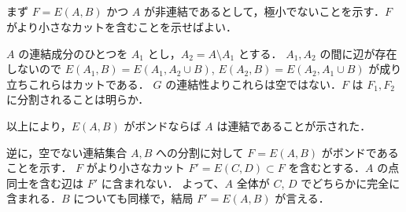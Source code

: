 \subsection{}
まず $F=E(A, B)$ かつ $A$ が非連結であるとして，極小でないことを示す．$F$ がより小さなカットを含むことを示せばよい．

$A$ の連結成分のひとつを $A_1$ とし，$A_2 = A\setminus A_1$ とする．
$A_1, A_2$ の間に辺が存在しないので $E(A_1, B) = E(A_1, A_2\cup B)$, $E(A_2, B) = E(A_2, A_1\cup B)$ が成り立ちこれらはカットである．
$G$ の連結性よりこれらは空ではない．$F$ は $F_1, F_2$ に分割されることは明らか．

以上により，$E(A, B)$ がボンドならば $A$ は連結であることが示された．

逆に，空でない連結集合 $A, B$ への分割に対して $F = E(A, B)$ がボンドであることを示す．
$F$ がより小さなカット $F'=E(C,D)\subset F$ を含むとする．$A$ の点同士を含む辺は $F'$ に含まれない．
よって、$A$ 全体が $C$, $D$ でどちらかに完全に含まれる．$B$ についても同様で，結局 $F' = E(A, B)$ が言える．